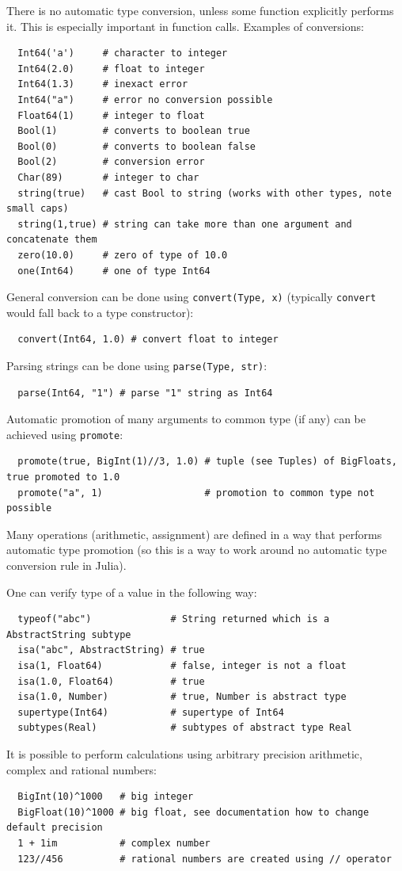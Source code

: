 \documentclass[10pt,a4paper]{article}
\begin{document}
There is no automatic type conversion, unless some function explicitly performs it. This is especially important in function calls. Examples of conversions:
\begin{lstlisting}
  Int64('a')     # character to integer
  Int64(2.0)     # float to integer
  Int64(1.3)     # inexact error
  Int64("a")     # error no conversion possible
  Float64(1)     # integer to float
  Bool(1)        # converts to boolean true
  Bool(0)        # converts to boolean false
  Bool(2)        # conversion error
  Char(89)       # integer to char
  string(true)   # cast Bool to string (works with other types, note small caps)
  string(1,true) # string can take more than one argument and concatenate them
  zero(10.0)     # zero of type of 10.0
  one(Int64)     # one of type Int64
\end{lstlisting}
General conversion can be done using \lstinline|convert(Type, x)| (typically \lstinline|convert| would fall back to a type constructor):
\begin{lstlisting}
  convert(Int64, 1.0) # convert float to integer
\end{lstlisting}
Parsing strings can be done using \lstinline|parse(Type, str)|:
\begin{lstlisting}
  parse(Int64, "1") # parse "1" string as Int64
\end{lstlisting}
Automatic promotion of many arguments to common type (if any) can be achieved using \lstinline|promote|:
\begin{lstlisting}
  promote(true, BigInt(1)//3, 1.0) # tuple (see Tuples) of BigFloats, true promoted to 1.0
  promote("a", 1)                  # promotion to common type not possible
\end{lstlisting}
Many operations (arithmetic, assignment) are defined in a way that performs automatic type promotion (so this is a way to work around no automatic type conversion rule in Julia).

One can verify type of a value in the following way:
\begin{lstlisting}
  typeof("abc")              # String returned which is a AbstractString subtype
  isa("abc", AbstractString) # true
  isa(1, Float64)            # false, integer is not a float
  isa(1.0, Float64)          # true
  isa(1.0, Number)           # true, Number is abstract type
  supertype(Int64)           # supertype of Int64
  subtypes(Real)             # subtypes of abstract type Real
\end{lstlisting}
It is possible to perform calculations using arbitrary precision arithmetic, complex and rational numbers:
\begin{lstlisting}
  BigInt(10)^1000   # big integer
  BigFloat(10)^1000 # big float, see documentation how to change default precision
  1 + 1im           # complex number
  123//456          # rational numbers are created using // operator
\end{lstlisting}
\end{document}
